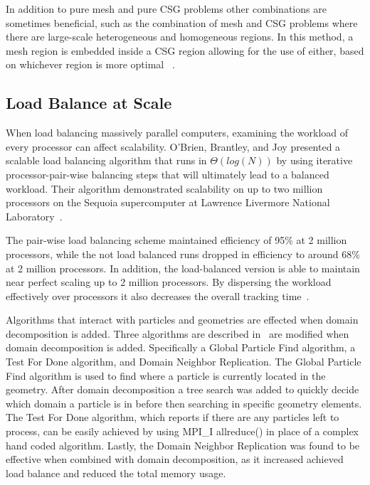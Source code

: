 In addition to pure mesh and pure CSG problems other combinations are sometimes beneficial, such as the combination of mesh and CSG problems where there are large-scale heterogeneous and homogeneous regions.
%
In this method, a mesh region is embedded inside a CSG region allowing for the use of either, based on whichever region is more optimal
~\cite{greenman2009enhancements}.

\subsection*{Load Balance at Scale}

%
When load balancing massively parallel computers, 
examining the workload of every processor can affect scalability.
%
O'Brien, Brantley, and Joy presented a scalable load balancing algorithm that runs in $\Theta ( log ( N ) )$ by using iterative processor-pair-wise balancing steps that will ultimately lead to a balanced workload.
%
Their algorithm demonstrated scalability on up to two million processors on the Sequoia supercomputer at Lawrence Livermore National Laboratory~\cite{o2013scalable}.
%

%
The pair-wise load balancing scheme maintained efficiency of 95\% at 2 million processors, while the not load balanced runs dropped in efficiency to around 68\% at 2 million processors.
%
In addition, the load-balanced version is able to maintain near perfect scaling up to 2 million processors.
%
By dispersing the workload effectively over processors it also decreases the overall tracking time~\cite{o2013scalable}.
%

Algorithms that interact with particles and geometries are effected when domain decomposition is added.
%
Three algorithms are described in~\cite{o2015particle} are modified when domain decomposition is added.
%
Specifically a Global Particle Find algorithm, a Test For Done algorithm, and Domain Neighbor Replication.
%
The Global Particle Find algorithm is used to find where a particle is currently located in the geometry.
%
After domain decomposition a tree search was added to quickly decide which domain a particle is in before then searching in specific geometry elements.
%
The Test For Done algorithm, which reports if there are any particles left to process, can be easily achieved by using MPI\_I allreduce() in place of a complex hand coded algorithm.
%
Lastly, the Domain Neighbor Replication was found to be effective when combined with domain decomposition, as it increased achieved load balance and reduced the total memory usage.
%


